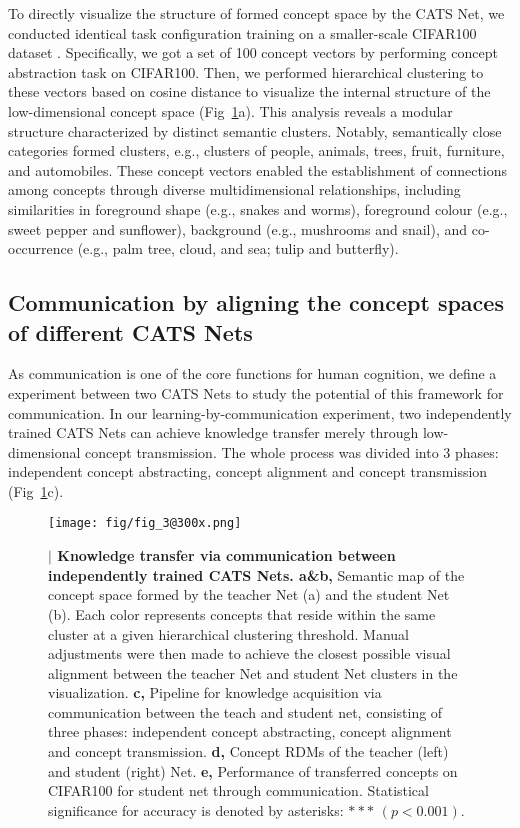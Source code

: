 \documentclass[pdflatex,sn-mathphys-num,lineno]{sn-jnl}%
\begin{document}
\begin{CJK}{UTF8}{gbsn}
To directly visualize the structure of formed concept space by the CATS Net, we conducted identical task configuration training on a smaller-scale CIFAR100 dataset \cite{krizhevsky_learning_2009}. Specifically, we got a set of 100 concept vectors by performing concept abstraction task on CIFAR100. Then, we performed hierarchical clustering to these vectors based on cosine distance to visualize the internal structure of the low-dimensional concept space (Fig~\ref{fig3}a). This analysis reveals a modular structure characterized by distinct semantic clusters. Notably, semantically close categories formed clusters, e.g., clusters of people, animals, trees, fruit, furniture, and automobiles. These concept vectors enabled the establishment of connections among concepts through diverse multidimensional relationships, including similarities in foreground shape (e.g., snakes and worms), foreground colour (e.g., sweet pepper and sunflower), background (e.g., mushrooms and snail), and co-occurrence (e.g., palm tree, cloud, and sea; tulip and butterfly).

\subsection{Communication by aligning the concept spaces of different CATS Nets}
As communication is one of the core functions for human cognition, we define a experiment between two CATS Nets to study the potential of this framework for communication. In our learning-by-communication experiment, two independently trained CATS Nets can achieve knowledge transfer merely through low-dimensional concept transmission. The whole process was divided into 3 phases: independent concept abstracting, concept alignment and concept transmission (Fig~\ref{fig3}c).

\begin{figure}[h]
\centering
\texttt{[image: fig/fig\_3@300x.png]}
\caption{\textbf{$\vert$ Knowledge transfer via communication between independently trained CATS Nets. a\&b,} Semantic map of the concept space formed by the teacher Net (a) and the student Net (b). Each color represents concepts that reside within the same cluster at a given hierarchical clustering threshold. Manual adjustments were then made to achieve the closest possible visual alignment between the teacher Net and student Net clusters in the visualization. \textbf{c,} Pipeline for knowledge acquisition via communication between the teach and student net, consisting of three phases: independent concept abstracting, concept alignment and concept transmission. \textbf{d,} Concept RDMs of the teacher (left) and student (right) Net. \textbf{e,} Performance of transferred concepts on CIFAR100 for student net through communication. Statistical significance for accuracy is denoted by asterisks: $***$ $(p < 0.001)$.}
\label{fig3}
\end{figure}


\end{CJK}
\end{document}
